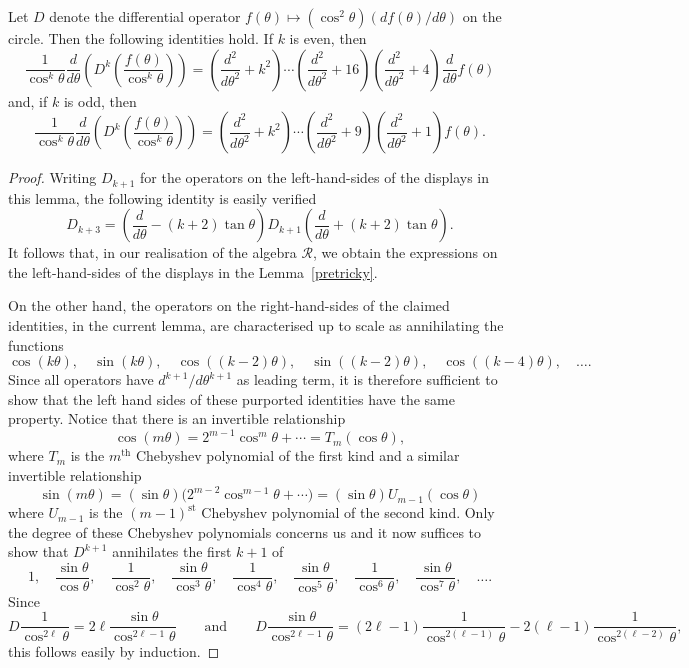\begin{lemma}\label{tricky} Let $D$ denote the differential operator
$f(\theta)\mapsto (\cos^2\theta)(df(\theta)/d\theta)$ on the circle. Then the
following identities hold. If $k$ is even, then
\[\frac{1}{\cos^k\theta}\frac{d}{d\theta}
\left(D^k\left(\frac{f(\theta)}{\cos^k\theta}\right)\right)
=\left(\frac{d^2}{d\theta^2}+k^2\right)\cdots
\left(\frac{d^2}{d\theta^2}+16\right)
\left(\frac{d^2}{d\theta^2}+4\right)\frac{d}{d\theta}f(\theta)\] and, if $k$ is
odd, then \[\frac{1}{\cos^k\theta}\frac{d}{d\theta}
\left(D^k\left(\frac{f(\theta)}{\cos^k\theta}\right)\right)
=\left(\frac{d^2}{d\theta^2}+k^2\right)\cdots
\left(\frac{d^2}{d\theta^2}+9\right)
\left(\frac{d^2}{d\theta^2}+1\right)f(\theta).\]
\end{lemma}
\begin{proof} Writing $D_{k+1}$ for the operators on the left-hand-sides of the
displays in this lemma,  the following identity is easily verif\/ied
\[
D_{k+3} = \left( \frac{d} { d\theta}
-(k + 2) \tan \theta\right)D_{k+1}\left( \frac{d}{ d \theta} + (k + 2) \tan \theta\right).\]
It follows that, in our realisation of the algebra ${\mathcal{R}}$,
we obtain the expressions on the left-hand-sides of the displays in
the Lemma~\ref{pretricky}.

On the other hand, the operators on the right-hand-sides of the
claimed identities, in the current lemma, are characterised up to scale
as annihilating the functions
\[\cos(k\theta),\quad \sin(k\theta),\quad \cos((k-2)\theta),\quad
\sin((k-2)\theta),\quad \cos((k-4)\theta),\quad \dots.\]
Since all operators have $d^{k+1}/d\theta^{k+1}$ as leading term, it is
therefore suf\/f\/icient to show that the left hand sides of these purported
identities have the same property. Notice that there is an invertible
relationship
\[\cos(m\theta)=2^{m-1}\cos^m\theta+\cdots=T_m(\cos\theta),\]
where $T_m$ is the $m^{\mathrm{th}}$ Chebyshev polynomial of the f\/irst kind
and a similar invertible relationship
\[\sin(m\theta)=(\sin\theta)\big(2^{m-2}\cos^{m-1}\theta+\cdots\big)
=(\sin\theta)U_{m-1}(\cos\theta)\]
where $U_{m-1}$ is the $(m-1)^{\mathrm{st}}$ Chebyshev polynomial of the
second kind. Only the degree of these Chebyshev polynomials concerns us and
it now suf\/f\/ices to show that $D^{k+1}$ annihilates the f\/irst $k+1$ of
\[1,\quad\frac{\sin\theta}{\cos\theta},\quad
\frac{1}{\cos^2\theta},\quad\frac{\sin\theta}{\cos^3\theta},\quad
\frac{1}{\cos^4\theta},\quad\frac{\sin\theta}{\cos^5\theta},\quad
\frac{1}{\cos^6\theta},\quad \frac{\sin\theta}{\cos^7\theta},\quad\dots.\]
Since
\[D\frac{1}{\cos^{2\ell}\theta}=2\ell\frac{\sin\theta}{\cos^{2\ell-1}\theta}
\qquad\mbox{and}\qquad
D\frac{\sin\theta}{\cos^{2\ell-1}\theta}
=(2\ell-1)\frac{1}{\cos^{2(\ell-1)}\theta}
-2(\ell-1)\frac{1}{\cos^{2(\ell-2)}\theta},\]
this follows easily by induction.
\end{proof}
